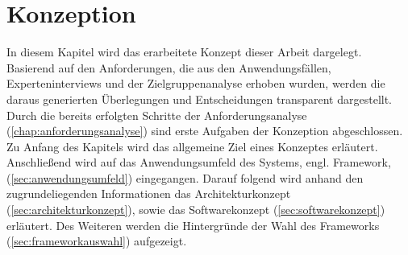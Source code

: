 \chapter{Konzeption}
\label{chap:konzept}
    In diesem Kapitel wird das erarbeitete Konzept dieser Arbeit dargelegt. Basierend auf den 
    Anforderungen, die aus den Anwendungsfällen, Experteninterviews und der Zielgruppenanalyse 
    erhoben wurden, werden die daraus generierten Überlegungen und Entscheidungen transparent 
    dargestellt. Durch die bereits erfolgten Schritte der Anforderungsanalyse (\ref{chap:anforderungsanalyse})
    sind erste Aufgaben der Konzeption abgeschlossen. 
    \\
    Zu Anfang des Kapitels wird das allgemeine Ziel eines Konzeptes erläutert. Anschließend 
    wird auf das Anwendungsumfeld des Systems, engl. Framework, (\ref{sec:anwendungsumfeld}) eingegangen. 
    Darauf folgend wird anhand den 
    zugrundeliegenden Informationen das Architekturkonzept (\ref{sec:architekturkonzept}), sowie das 
    Softwarekonzept (\ref{sec:softwarekonzept}) erläutert. Des Weiteren werden die Hintergründe der 
    Wahl des Frameworks (\ref{sec:frameworkauswahl}) aufgezeigt. %

